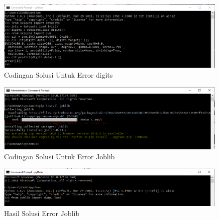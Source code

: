 \begin{figure}[ht]
      \centerline{\includegraphics[width=1\textwidth]
      {figures/c7}}
      \caption{Codingan Solusi Untuk Error digits}
      \label{c7}
      \end{figure}

\begin{figure}[ht]
      \centerline{\includegraphics[width=1\textwidth]
      {figures/c8}}
      \caption{Codingan Solusi Untuk Error Joblib}
      \label{c8}
      \end{figure}

\begin{figure}[ht]
      \centerline{\includegraphics[width=1\textwidth]
      {figures/c9}}
      \caption{Hasil Solusi Error Joblib}
      \label{c9}
      \end{figure}